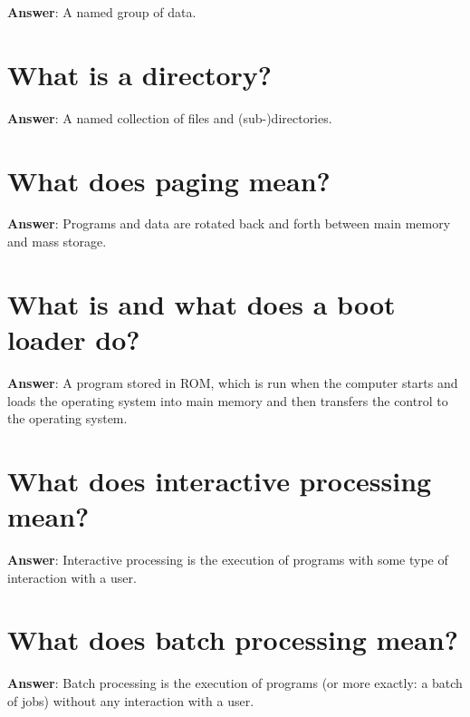 \documentclass[a4paper,11pt,oneside]{book}
\begin{document}
\begin{sloppypar}
\label{q:122:sa:en:True}

\textbf{Answer}: A named group of data.



\section{What is a directory?}

\label{q:123:sa:en:True}

\textbf{Answer}: A named collection of files and (sub-)directories.



\section{What does paging mean?}

\label{q:124:sa:en:True}

\textbf{Answer}: Programs and data are rotated back and forth between main memory and mass storage.



\section{What is and what does a boot loader do?}

\label{q:125:sa:en:True}

\textbf{Answer}: A program stored in ROM, which is run when the computer starts and loads the operating system into main memory and then transfers the control to the operating system.



\section{What does interactive processing mean?}

\label{q:126:sa:en:True}

\textbf{Answer}: Interactive processing is the execution of programs with some type of interaction with a user.



\section{What does batch processing mean?}

\label{q:127:sa:en:True}

\textbf{Answer}: Batch processing is the execution of programs (or more exactly: a batch of jobs) without any interaction with a user.




\end{sloppypar}
\end{document}
